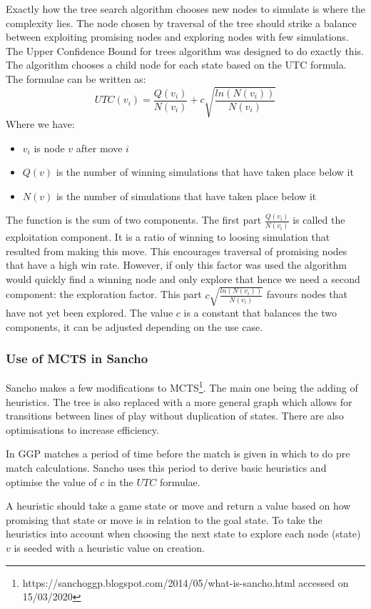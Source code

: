 Exactly how the tree search algorithm chooses new nodes to simulate is where the complexity lies. The node chosen by traversal of the tree should strike a balance between exploiting promising nodes and exploring nodes with few simulations. The Upper Confidence Bound for trees algorithm was designed to do exactly this\cite{Kocsis/UCT}. The algorithm chooses a child node for each state based on the UTC formula. The formulae can be written as: \[UTC(v_i) = \frac{Q(v_i)}{N(v_i)} + c\sqrt{\frac{ln(N(v_i))}{N(v_i)}}\] Where we have:
\begin{itemize}
\item $v_i$ is node $v$ after move $i$
\item $Q(v)$ is the number of winning simulations that have taken place below it
\item $N(v)$ is the number of simulations that have taken place below it
\end{itemize}
The function is the sum of two components. The first part $\frac{Q(v_i)}{N(v_i)}$ is called the exploitation component. It is a ratio of winning to loosing simulation that resulted from making this move. This encourages traversal of promising nodes that have a high win rate. However, if only this factor was used the algorithm would quickly find a winning node and only explore that hence we need a second component: the exploration factor. This part $c\sqrt{\frac{ln(N(v_i))}{N(v_i)}}$ favours nodes that have not yet been explored. The value $c$ is a constant that balances the two components, it can be adjusted depending on the use case.

\subsubsection{Use of MCTS in Sancho}

Sancho makes a few modifications to MCTS\footnote{https://sanchoggp.blogspot.com/2014/05/what-is-sancho.html accessed on 15/03/2020}. The main one being the adding of heuristics. The tree is also replaced with a more general graph which allows for transitions between lines of play without duplication of states. There are also optimisations to increase efficiency.

In GGP matches a period of time before the match is given in which to do pre match calculations. Sancho uses this period to derive basic heuristics and optimise the value of $c$ in the $UTC$ formulae.

A heuristic should take a game state or move and return a value based on how promising that state or move is in relation to the goal state. To take the heuristics into account when choosing the next state to explore each node (state) $v$ is seeded with a heuristic value on creation.

